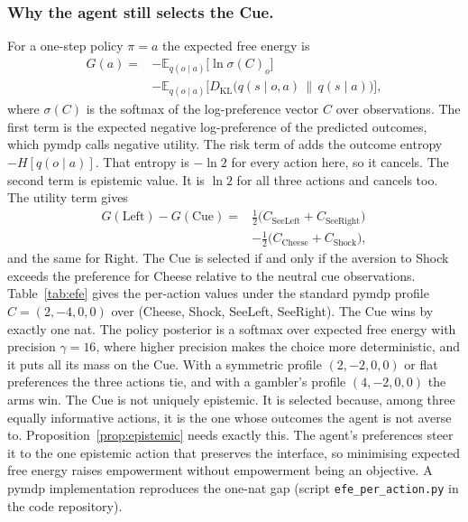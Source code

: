 \documentclass[letterpaper]{article} %
\theoremstyle{definition}
\providecommand{\E}{\mathbb{E}}
\providecommand{\KL}{D_{\mathrm{KL}}}
\begin{document}
\subsubsection{Why the agent still selects the Cue.}
For a one-step policy $\pi = a$ the expected free energy is
\begin{equation}
\begin{split}
G(a) = {} & -\E_{q(o \mid a)}\big[\ln \sigma(C)_o\big] \\
& - \E_{q(o \mid a)}\big[\KL\big(q(s \mid o, a)\,\|\,q(s \mid a)\big)\big],
\end{split}
\label{eq:efe}
\end{equation}
where $\sigma(C)$ is the softmax of the log-preference vector $C$ over observations. The first term is the expected negative log-preference of the predicted outcomes, which pymdp calls negative utility. The risk term of \citet{friston2015active} adds the outcome entropy $-H[q(o \mid a)]$. That entropy is $-\ln 2$ for every action here, so it cancels. The second term is epistemic value. It is $\ln 2$ for all three actions and cancels too. The utility term gives
\begin{equation}
\begin{split}
G(\text{Left}) - G(\text{Cue}) = {} & \tfrac12\big(C_{\text{SeeLeft}} + C_{\text{SeeRight}}\big) \\
& - \tfrac12\big(C_{\text{Cheese}} + C_{\text{Shock}}\big),
\end{split}
\label{eq:risk}
\end{equation}
and the same for Right. The Cue is selected if and only if the aversion to Shock exceeds the preference for Cheese relative to the neutral cue observations. Table~\ref{tab:efe} gives the per-action values under the standard pymdp profile $C = (2, -4, 0, 0)$ over (Cheese, Shock, SeeLeft, SeeRight). The Cue wins by exactly one nat. The policy posterior is a softmax over expected free energy with precision $\gamma = 16$, where higher precision makes the choice more deterministic, and it puts all its mass on the Cue. With a symmetric profile $(2,-2,0,0)$ or flat preferences the three actions tie, and with a gambler's profile $(4,-2,0,0)$ the arms win. The Cue is not uniquely epistemic. It is selected because, among three equally informative actions, it is the one whose outcomes the agent is not averse to. Proposition~\ref{prop:epistemic} needs exactly this. The agent's preferences steer it to the one epistemic action that preserves the interface, so minimising expected free energy raises empowerment without empowerment being an objective. A pymdp implementation reproduces the one-nat gap (script \texttt{efe\_per\_action.py} in the code repository).
\end{document}
